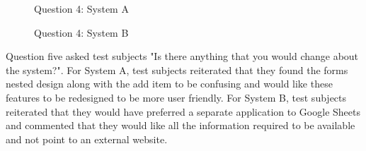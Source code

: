 \begin{figure}[!h]
  \centering
  \begin{minipage}[b]{0.47\textwidth}
    \caption{Question 4: System A}
    \label{fig:finalQ3Bioschemas}
  \end{minipage}
  \hfill
  \begin{minipage}[b]{0.47\textwidth}
    \caption{Question 4: System B}
    \label{fig:finalQ3Kaizen}
  \end{minipage}
\end{figure}

Question five asked test subjects "Is there anything that you would change about the system?". For System A, test subjects reiterated that they found the forms nested design along with the add item to be confusing and would like these features to be redesigned to be more user friendly. For System B, test subjects reiterated that they would have preferred a separate application to Google Sheets and commented that they would like all the information required to be available and not point to an external website.

